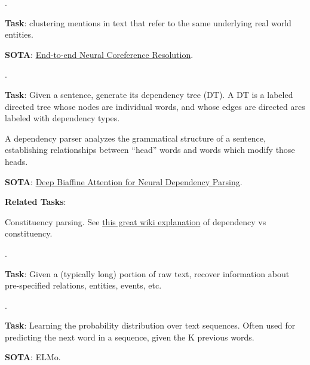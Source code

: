 \documentclass[11pt]{article}
\newcommand\myspace[1][]{\vspace{#1\bigskipamount}}
\newcommand\p{\Needspace{10\baselineskip} \noindent}
\begin{document}
\myspace
\p {}. 
\begin{compactitem}
	\item \textbf{Task}: clustering mentions in text that refer to the same underlying real world entities.
	
	\item \textbf{SOTA}: \href{https://arxiv.org/abs/1707.07045}{End-to-end Neural Coreference Resolution}. 
\end{compactitem}

\myspace
\p {}. 
\begin{compactitem}
	\item \textbf{Task}: Given a sentence, generate its dependency tree (DT). A DT is a labeled directed tree whose nodes are individual words, and whose edges are directed arcs labeled with dependency types.  
	\begin{compactitem}
		\item A dependency parser analyzes the grammatical structure of a sentence, establishing relationships between ``head'' words and words which modify those heads.
	\end{compactitem}
	
	\item \textbf{SOTA}: \href{https://arxiv.org/abs/1611.01734}{Deep Biaffine Attention for Neural Dependency Parsing}.
	
	\textbf{Related Tasks}:
	\begin{compactitem}
		\item Constituency parsing. See \href{https://www.wikiwand.com/en/Dependency_grammar#/Dependency_vs._constituency}{this great wiki explanation} of dependency vs constituency.
	\end{compactitem}
\end{compactitem}


\myspace
\p {}. 
\begin{compactitem}
	\item \textbf{Task}: Given a (typically long) portion of raw text, recover information about pre-specified relations, entities, events, etc. 
\end{compactitem}

\myspace
\p {}.
\begin{compactitem}
	\item \textbf{Task}: Learning the probability distribution over text sequences. Often used for predicting the next word in a sequence, given the K previous words.
	
	\item \textbf{SOTA}: ELMo.
\end{compactitem}
\end{document}

